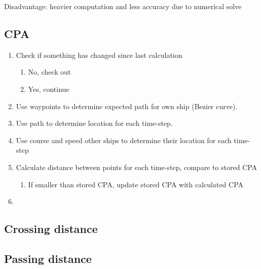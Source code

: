 Disadvantage: heavier computation and less accuracy due to numerical solve

\subsection{\acf{CPA}}
\begin{enumerate}
	\item Check if something has changed since last calculation
	\begin{enumerate}
		\item No, check out
		\item Yes, continue
	\end{enumerate}
	\item Use waypoints to determine expected path for own ship (Bezier curve).
	\item Use path to determine location for each time-step.
	\item Use course and speed other ships to determine their location for each time-step
	\item Calculate distance between points for each time-step, compare to stored CPA
	\begin{enumerate}
		\item If smaller than stored CPA, update stored CPA with calculated CPA
	\end{enumerate}
	\item 
	
\end{enumerate}


\subsection{Crossing distance}

\subsection{Passing distance}


